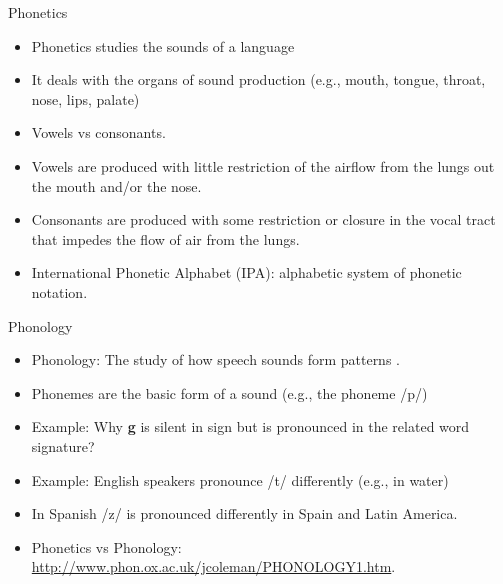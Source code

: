 \documentclass[handout]{beamer}
\begin{document}
\begin{frame}{Phonetics}
\scriptsize{
\begin{itemize}
 \item Phonetics studies the sounds of a language \cite{JohnsonMLSS}
 \item It deals with the organs of sound production (e.g., mouth, tongue, throat, nose, lips, palate)
\item Vowels vs consonants.
\item Vowels are produced with little restriction of the airflow from the lungs out
the mouth and/or the nose. \cite{fromkin2018introduction}
\item Consonants are produced with some restriction or closure in the vocal tract that
impedes the flow of air from the lungs. \cite{fromkin2018introduction}
\item International Phonetic Alphabet (IPA):  alphabetic system of phonetic notation. 


\end{itemize}
}
\end{frame}


\begin{frame}{Phonology}
\scriptsize{
\begin{itemize}
\item Phonology: The study of how speech sounds form patterns \cite{fromkin2018introduction}.
\item Phonemes are  the basic form of a sound (e.g., the phoneme /p/)
\item Example: Why \textbf{g} is silent in sign but is pronounced in the related word signature?
\item Example: English speakers pronounce /t/ differently (e.g., in water)
\item In Spanish /z/ is pronounced differently in Spain and Latin America.
\item Phonetics vs Phonology: \url{http://www.phon.ox.ac.uk/jcoleman/PHONOLOGY1.htm}.
\end{itemize}
}
\end{frame}
\end{document}
